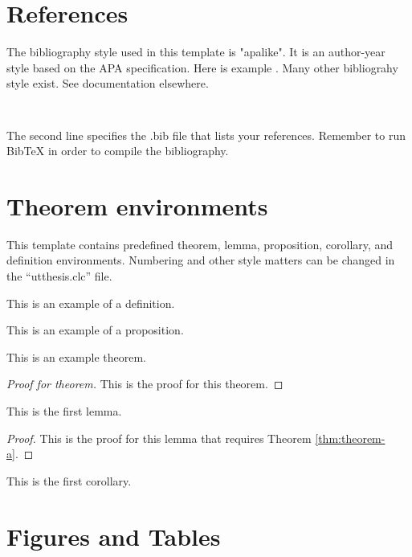 \clearpage

\section{References}
The bibliography style used in this template is "apalike". It is an author-year style based on the APA specification. 
Here is example \citep{Fermi1956,Iznogood2000}. Many other bibliograhy style exist. See documentation elsewhere.
\begin{verbatim}


\end{verbatim} 
The second line specifies the .bib file that lists your references. Remember to run BibTeX in order to compile the bibliography. 

\section{Theorem environments}
This template contains predefined theorem, lemma, proposition, corollary, and definition environments. Numbering and other
style matters can be changed in the ``utthesis.clc'' file.

\begin{definition}
	This is an example of a definition.
\end{definition}
\begin{proposition}
	This is an example of a proposition.
\end{proposition}
\begin{theorem}\label{thm:theorem-a}
    This is an example theorem.
\end{theorem}
\begin{proof}[Proof for theorem]
    This is the proof for this theorem.
\end{proof}
\begin{lemma}
    This is the first lemma.
\end{lemma}
\begin{proof}
	This is the proof for this lemma that requires Theorem \ref{thm:theorem-a}.
\end{proof}
\begin{corollary}
    This is the first corollary.
\end{corollary}

\section{Figures and Tables}

